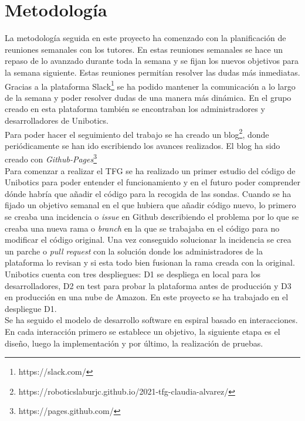 \section{Metodología}

La metodología seguida en este proyecto ha comenzado con la planificación de reuniones semanales con los tutores. En estas reuniones semanales se hace un repaso de lo avanzado durante toda la semana y se fijan los nuevos objetivos para la semana siguiente. Estas reuniones permitían resolver las dudas más inmediatas. Gracias a la plataforma Slack\footnote{https://slack.com/} se ha podido mantener la comunicación a lo largo de la semana y poder resolver dudas de una manera más dinámica. En el grupo creado en esta plataforma también se encontraban los administradores y desarrolladores de Unibotics.\\

Para poder hacer el seguimiento del trabajo se ha creado un blog\footnote{https://roboticslaburjc.github.io/2021-tfg-claudia-alvarez/}, donde periódicamente se han ido escribiendo los avances realizados. El blog ha sido creado con \textit{Github-Pages}\footnote{https://pages.github.com/}\\

Para comenzar a realizar el TFG se ha realizado un primer estudio del código de Unibotics para poder entender el funcionamiento y en el futuro poder comprender dónde habría que añadir el código para la recogida de las sondas. Cuando se ha fijado un objetivo semanal en el que hubiera que añadir código nuevo, lo primero se creaba una incidencia o \textit{issue} en Github describiendo el problema por lo que se creaba una nueva rama o \textit{branch} en la que se trabajaba en el código para no modificar el código original. Una vez conseguido solucionar la incidencia se crea un parche o \textit{pull request} con la solución donde los administradores de la plataforma lo revisan y si esta todo bien fusionan la rama creada con la original.\\

Unibotics cuenta con tres despliegues: D1 se despliega en local para los desarrolladores, D2 en test para probar la plataforma antes de producción y D3 en producción en una nube de Amazon. En este proyecto se ha trabajado en el despliegue D1.\\

Se ha seguido el modelo de desarrollo software en espiral basado en interacciones. En cada interacción primero se establece un objetivo, la siguiente etapa es el diseño, luego la implementación y por último, la realización de pruebas.


